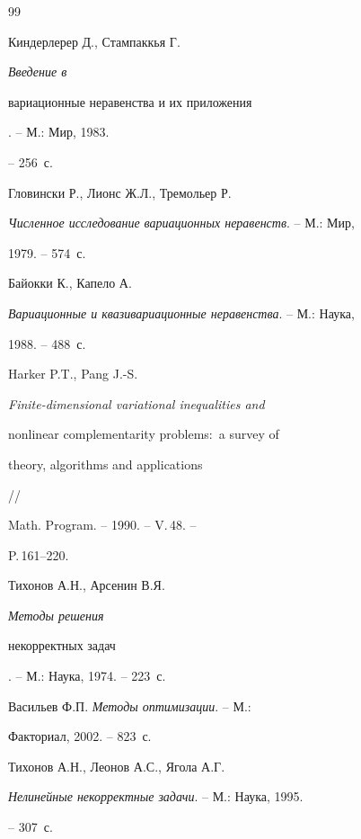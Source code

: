 \begin{thebibliography}{99}








 Киндерлерер Д., Стампаккья Г. {\em Введение в


вариационные неравенства и их приложения}. -- М.: Мир, 1983.


-- 256~с.





 Гловински Р., Лионс Ж.Л., Тремольер Р. 


{\em Численное исследование вариационных неравенств}. -- М.: Мир,


1979. -- 574~с.





 Байокки К., Капело А.


{\em Вариационные и квазивариационные неравенства}. -- М.: Наука,


1988. -- 488~с.





 Harker P.T., Pang J.-S.


{\em Finite-dimensional variational inequalities and


nonlinear complementarity problems$:$ a survey of


theory, algorithms and applications} //


Math. Program. -- 1990. -- V.\,48. --


P.\,161--220.





 Тихонов А.Н., Арсенин В.Я. {\em Методы решения


некорректных задач}. -- М.: Наука, 1974. -- 223~с.





 Васильев Ф.П. {\em Методы оптимизации}. -- М.:


Факториал, 2002. -- 823~с.





 Тихонов А.Н., Леонов А.С., Ягола А.Г.


{\em  Нелинейные некорректные задачи}. -- М.: Наука, 1995.


-- 307~с.






\end{thebibliography}
